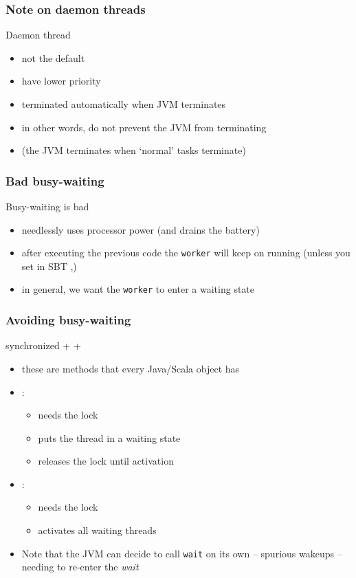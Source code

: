 \documentclass[aspectratio=169]{beamer}
\begin{document}
\begin{frame}\frametitle{Note on daemon threads}
  \begin{alertblock}{Daemon thread}
    \begin{itemize}
      \item not the default
      \item have lower priority
      \item terminated automatically when JVM terminates
      \item in other words, do not prevent the JVM from terminating
      \item (the JVM terminates when `normal' tasks terminate)
    \end{itemize}    
  \end{alertblock}
\end{frame}


\begin{frame}\frametitle{Bad busy-waiting}
    
  \begin{block}{Busy-waiting is bad}
    \begin{itemize}
      \item needlessly uses processor power (and drains the battery)
      \item after executing the previous code the \texttt{worker} will keep on running (unless you set in SBT ,)
      \item in general, we want the \texttt{worker} to enter a waiting state
    \end{itemize}
    
  \end{block}
\end{frame}

\begin{frame}\frametitle{Avoiding busy-waiting}
\centering

{\Large \alert{synchronized} +  + }

\begin{itemize}
  \item these are methods that every Java/Scala object has
  \item {}:
    \begin{itemize}
      \item needs the lock
      \item puts the thread in a \alert{waiting} state
      \item releases the lock until activation
    \end{itemize}
  \item {}:
    \begin{itemize}
      \item needs the lock
      \item \alert{activates} all waiting threads
    \end{itemize}
  \pause
  \item Note that the JVM can decide to call \texttt{wait} on its own -- \alert{spurious wakeups} -- needing to re-enter the \emph{wait}
\end{itemize}
\end{frame}
\end{document}
